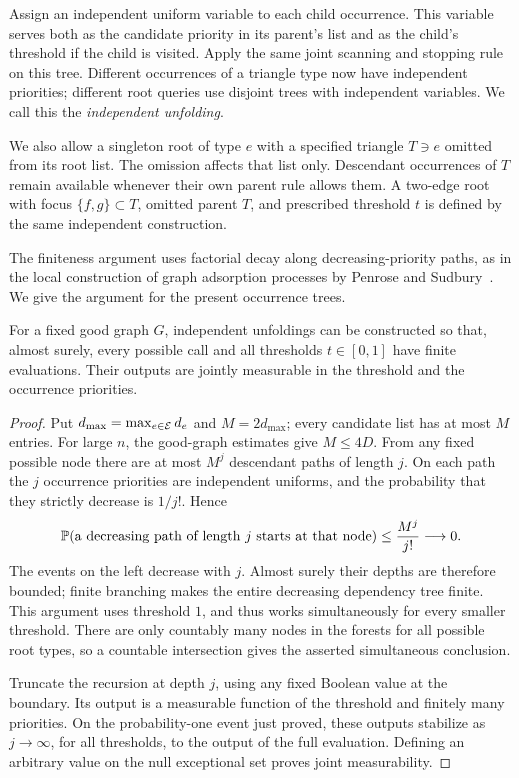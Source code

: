Assign an independent uniform variable to each child occurrence.  This
variable serves both as the candidate priority in its parent's list
and as the child's threshold if the child is visited.  Apply the same
joint scanning and stopping rule on this tree.  Different occurrences
of a triangle type now have independent priorities; different root
queries use disjoint trees with independent variables.  We call this
the \emph{independent unfolding}.

We also allow a singleton root of type $e$ with a specified triangle
$T\ni e$ omitted from its root list.  The omission affects that list
only.  Descendant occurrences of $T$ remain available whenever their
own parent rule allows them.  A two-edge root with focus
$\{f,g\}\subset T$, omitted parent $T$, and prescribed threshold $t$
is defined by the same independent construction.

The finiteness argument uses factorial decay along decreasing-priority
paths, as in the local construction of graph adsorption processes by
Penrose and Sudbury~\cite[Proposition~1 and its proof]{PenroseSudbury2005}.
We give the argument for the present occurrence trees.

\begin{lemma}\label{lem:unfolding-finite}
For a fixed good graph $G$, independent unfoldings can be constructed
so that, almost surely, every possible call and all thresholds
$t\in[0,1]$ have finite evaluations.  Their outputs are jointly
measurable in the threshold and the occurrence priorities.
\end{lemma}

\begin{proof}
Put $d_{\max}=\max_{e\in\mathcal E}d_e$ and $M=2d_{\max}$; every candidate
list has at most $M$ entries.  For large $n$, the good-graph estimates
give $M\le4D$.  From any fixed possible node there are at most $M^j$
descendant paths of length $j$.  On each path the $j$ occurrence
priorities are independent uniforms, and the probability that they
strictly decrease is $1/j!$.  Hence
\[
 \mathbb P(\text{a decreasing path of length $j$ starts at that node})
 \le \frac{M^j}{j!}\longrightarrow0.
\]
The events on the left decrease with $j$.  Almost surely their depths
are therefore bounded; finite branching makes the entire decreasing
dependency tree finite.  This argument uses threshold $1$, and thus
works simultaneously for every smaller threshold.  There are only
countably many nodes in the forests for all possible root types, so a
countable intersection gives the asserted simultaneous conclusion.

Truncate the recursion at depth $j$, using any fixed Boolean value at
the boundary.  Its output is a measurable function of the threshold
and finitely many priorities.  On the probability-one event just
proved, these outputs stabilize as $j\to\infty$, for all thresholds,
to the output of the full evaluation.  Defining an arbitrary value on
the null exceptional set proves joint measurability.
\end{proof}

